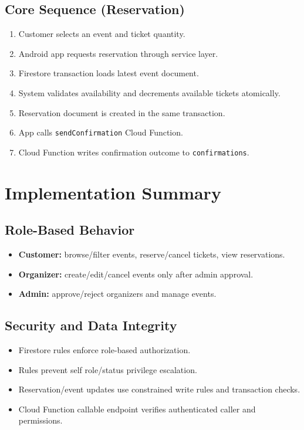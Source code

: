 \documentclass[12pt,a4paper]{article}
\begin{document}
\subsection{Core Sequence (Reservation)}

\begin{enumerate}
    \item Customer selects an event and ticket quantity.
    \item Android app requests reservation through service layer.
    \item Firestore transaction loads latest event document.
    \item System validates availability and decrements available tickets atomically.
    \item Reservation document is created in the same transaction.
    \item App calls \texttt{sendConfirmation} Cloud Function.
    \item Cloud Function writes confirmation outcome to \texttt{confirmations}.
\end{enumerate}

\section{Implementation Summary}

\subsection{Role-Based Behavior}

\begin{itemize}
    \item \textbf{Customer:} browse/filter events, reserve/cancel tickets, view reservations.
    \item \textbf{Organizer:} create/edit/cancel events only after admin approval.
    \item \textbf{Admin:} approve/reject organizers and manage events.
\end{itemize}

\subsection{Security and Data Integrity}

\begin{itemize}
    \item Firestore rules enforce role-based authorization.
    \item Rules prevent self role/status privilege escalation.
    \item Reservation/event updates use constrained write rules and transaction checks.
    \item Cloud Function callable endpoint verifies authenticated caller and permissions.
\end{itemize}
\end{document}
